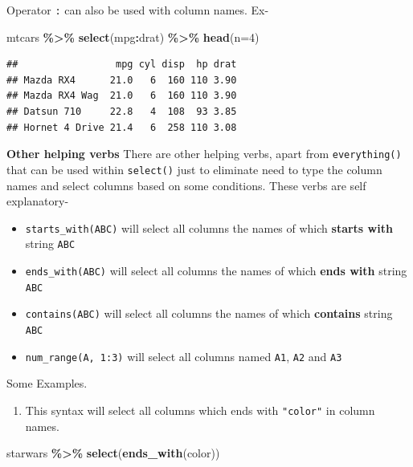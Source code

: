 \documentclass[
]{book}
\newenvironment{Shaded}{\begin{snugshade}}{\end{snugshade}}
\newcommand{\AttributeTok}[1]{\textcolor[rgb]{0.13,0.29,0.53}{#1}}
\newcommand{\DecValTok}[1]{\textcolor[rgb]{0.00,0.00,0.81}{#1}}
\newcommand{\FunctionTok}[1]{\textcolor[rgb]{0.13,0.29,0.53}{\textbf{#1}}}
\newcommand{\NormalTok}[1]{#1}
\newcommand{\SpecialCharTok}[1]{\textcolor[rgb]{0.81,0.36,0.00}{\textbf{#1}}}
\newcommand{\StringTok}[1]{\textcolor[rgb]{0.31,0.60,0.02}{#1}}
\providecommand{\tightlist}{%
  \setlength{\itemsep}{0pt}\setlength{\parskip}{0pt}}
\begin{document}
Operator \texttt{:} can also be used with column names. Ex-

\begin{Shaded}
\begin{Highlighting}[]
\NormalTok{mtcars }\SpecialCharTok{\%\textgreater{}\%} 
  \FunctionTok{select}\NormalTok{(mpg}\SpecialCharTok{:}\NormalTok{drat) }\SpecialCharTok{\%\textgreater{}\%} 
  \FunctionTok{head}\NormalTok{(}\AttributeTok{n=}\DecValTok{4}\NormalTok{)}
\end{Highlighting}
\end{Shaded}

\begin{verbatim}
##                 mpg cyl disp  hp drat
## Mazda RX4      21.0   6  160 110 3.90
## Mazda RX4 Wag  21.0   6  160 110 3.90
## Datsun 710     22.8   4  108  93 3.85
## Hornet 4 Drive 21.4   6  258 110 3.08
\end{verbatim}

\textbf{Other helping verbs}
There are other helping verbs, apart from \texttt{everything()} that can be used within \texttt{select()} just to eliminate need to type the column names and select columns based on some conditions. These verbs are self explanatory-

\begin{itemize}
\tightlist
\item
  \texttt{starts\_with(\textquotesingle{}ABC\textquotesingle{})} will select all columns the names of which \textbf{starts with} string \texttt{ABC}
\item
  \texttt{ends\_with(\textquotesingle{}ABC\textquotesingle{})} will select all columns the names of which \textbf{ends with} string \texttt{ABC}
\item
  \texttt{contains(\textquotesingle{}ABC\textquotesingle{})} will select all columns the names of which \textbf{contains} string \texttt{ABC}
\item
  \texttt{num\_range(\textquotesingle{}A\textquotesingle{},\ 1:3)} will select all columns named \texttt{A1}, \texttt{A2} and \texttt{A3}
\end{itemize}

Some Examples.

\begin{enumerate}
\def\labelenumi{\arabic{enumi}.}
\tightlist
\item
  This syntax will select all columns which ends with \texttt{"color"} in column names.
\end{enumerate}

\begin{Shaded}
\begin{Highlighting}[]
\NormalTok{starwars }\SpecialCharTok{\%\textgreater{}\%} 
  \FunctionTok{select}\NormalTok{(}\FunctionTok{ends\_with}\NormalTok{(}\StringTok{\textquotesingle{}color\textquotesingle{}}\NormalTok{))}
\end{Highlighting}
\end{Shaded}
\end{document}
